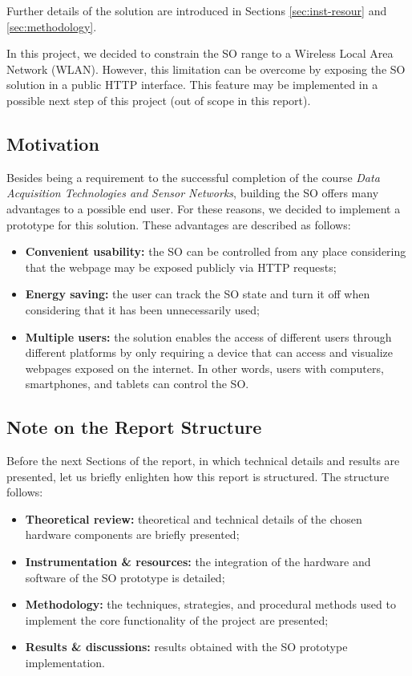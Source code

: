 Further details of the solution are introduced in Sections
\ref{sec:inst-resour} and \ref{sec:methodology}.

In this project, we decided to constrain the SO range to a Wireless Local Area
Network (WLAN). However, this limitation can be overcome by exposing the SO
solution in a public HTTP interface. This feature may be implemented in a
possible next step of this project (out of scope in this report).

\subsection{Motivation}

Besides being a requirement to the successful completion of the course
\textit{Data Acquisition Technologies and Sensor Networks}, building the SO
offers many advantages to a possible end user. For these reasons, we
decided to implement a prototype for this solution. These advantages are
described as follows:

\begin{itemize}
    \item \textbf{Convenient usability:} the SO can be controlled from any place
    considering that the webpage may be exposed publicly via HTTP requests;
    \item \textbf{Energy saving:} the user can track the SO state and turn it
    off when considering that it has been unnecessarily used;
    \item \textbf{Multiple users:} the solution enables the access of different
    users through different platforms by only requiring a device that can access
    and visualize webpages exposed on the internet. In other words, users with
    computers, smartphones, and tablets can control the SO.
\end{itemize}

\subsection{Note on the Report Structure}

Before the next Sections of the report, in which technical details and results are
presented, let us briefly enlighten how this report is structured. The structure
follows: 

\begin{itemize}
    \item \textbf{Theoretical review:} theoretical and technical details of the
    chosen hardware components are briefly presented;
    \item \textbf{Instrumentation \& resources:} the integration of the hardware
    and software of the SO prototype is detailed;
    \item \textbf{Methodology:} the techniques, strategies, and procedural
    methods used to implement the core functionality of the project are
    presented;
    \item \textbf{Results \& discussions:} results obtained with the SO
    prototype implementation.
\end{itemize}


